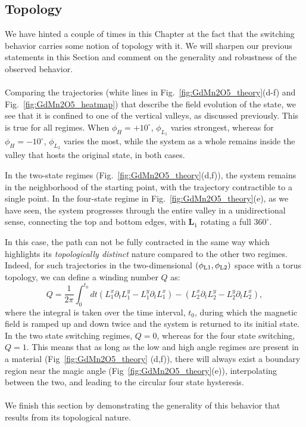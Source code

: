 \subsection{Topology \label{sec:GdMn2O5_topology}}
We have hinted a couple of times in this Chapter at the fact that the switching behavior carries some notion of topology with it.
We will sharpen our previous statements in this Section and comment on the generality and robustness of the observed behavior.
\\\\
Comparing the trajectories (white lines in Fig.~\ref{fig:GdMn2O5_theory}(d-f) and Fig.~\ref{fig:GdMn2O5_heatmap}) that describe the field evolution of the state, we see that it is confined to one of the vertical valleys, as discussed previously.
This is true for all regimes. When $\phi_H = +10^\circ$, $\phi_{L_1}$ varies strongest, whereas for $\phi_H = -10^\circ$, $\phi_{L_2}$ varies the most, while the system as a whole remains inside the valley that hosts the original state, in both cases.

In the two-state regimes (Fig.~\ref{fig:GdMn2O5_theory}(d,f)), the system remains in the neighborhood of the starting point, with the trajectory contractible to a single point. 
In the four-state regime in Fig.~\ref{fig:GdMn2O5_theory}(e), as we have seen, the system progresses through the entire valley in a unidirectional sense, connecting the top and bottom edges, with $\bm{L}_1$ rotating a full $360^\circ$.

In this case, the path can not be fully contracted in the same way which highlights its {\em  topologically distinct} nature compared to the other two regimes.
Indeed, for such trajectories in the two-dimensional $(\phi_{\rm L1},\phi_{\rm L2})$ space with a torus topology, we can define a winding number $Q$ as:
\begin{equation}
Q=\frac{1}{2\pi}\int_0^{t_0} dt (L_1^x\partial_t L_1^y - L_1^y \partial_t L_1^x) - (L_2^x\partial_t L_2^y - L_2^y \partial_t L_2^x),
\end{equation}
where the integral is taken over the time interval, $t_0$, during which the magnetic field is ramped up and down twice and the system is returned to its initial state.
In the two state switching regimes, $Q  = 0$, whereas for the four state switching, $Q = 1$.
This means that as long as the low and high angle regimes are present in a material (Fig~\ref{fig:GdMn2O5_theory} (d,f)), there will always exist a boundary region near the magic angle (Fig~\ref{fig:GdMn2O5_theory}(e)), interpolating between the two, and leading to the circular four state hysteresis.
\\\\
We finish this section by demonstrating the generality of this behavior that results from its topological nature.

